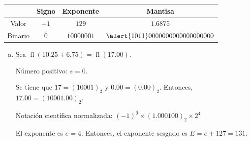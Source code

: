 \begin{frame}
\begin{solution}
\begin{enumerate}[b)]
			      \begin{table}[ht!]
				      \begin{tabular}{c|c|c|c}
					              & Signo & Exponente  & Mantisa                           \\
					      \hline
					      Valor   & $+1$  & $129$      & $1.6875$                          \\
					      \hline
					      Binario & $0$   & $10000001$ & $\alert{1011}0000000000000000000$
				      \end{tabular}
			      \end{table}
		\end{enumerate}
	\end{solution}
\end{frame}

\begin{frame}
	\begin{solution}
		\begin{enumerate}[c)]
			\item
			      Sea
			      \begin{math}
				      \operatorname{fl}\left(10.25+6.75\right)=
				      \operatorname{fl}\left(17.00\right)
			      \end{math}.

			      Número positivo: $s=0$.

			      Se tiene que
			      \begin{math}
				      17={\left(10001\right)}_{2}
			      \end{math}
			      y
			      \begin{math}
				      0.00={\left(0.00\right)}_{2}
			      \end{math}.
			      Entonces,
			      \begin{math}
				      17.00=
				      {\left(10001.00\right)}_{2}
			      \end{math}.

			      Notación científica normalizada:
			      \begin{math}
				      {\left(-1\right)}^{0}\times
				      \left(1.000100\right)_{2}
				      \times 2^{4}
			      \end{math}

			      El exponente es $e=4$.
			      Entonces, el exponente sesgado es
			      \begin{math}
				      E=
				      e+127=131
			      \end{math}.


\end{enumerate}
\end{solution}
\end{frame}
